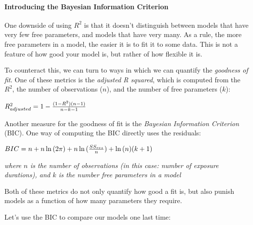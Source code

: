 \documentclass[11pt]{article}
\begin{document}
    \paragraph{Introducing the Bayesian Information
Criterion}\label{introducing-the-bayesian-information-criterion}

One downside of using \(R^{2}\) is that it doesn't distinguish between
models that have very few free parameters, and models that have very
many. As a rule, the more free parameters in a model, the easier it is
to fit it to some data. This is not a feature of how good your model is,
but rather of how flexible it is.

To counteract this, we can turn to ways in which we can quantify the
\emph{goodness of fit}. One of these metrics is the \emph{adjusted R
squared}, which is computed from the \(R^{2}\), the number of
observations (\(n\)), and the number of free parameters (\(k\)):

\(R^{2}_{adjusted} = 1 - {{(1 - R^{2}) (n - 1)} \over {n - k - 1}}\)

Another measure for the goodness of fit is the \emph{Bayesian
Information Criterion} (BIC). One way of computing the BIC directly uses
the residuals:

\(BIC = n + n \ln{(2 \pi)} + n \ln{({{SS_{res}} \over {n}})} + \ln{(n)}(k + 1)\)

\emph{where \(n\) is the number of observations (in this case: number of
exposure durations), and \(k\) is the number free parameters in a model}

Both of these metrics do not only quantify how good a fit is, but also
punish models as a function of how many parameters they require.

Let's use the BIC to compare our models one last time:
\end{document}
